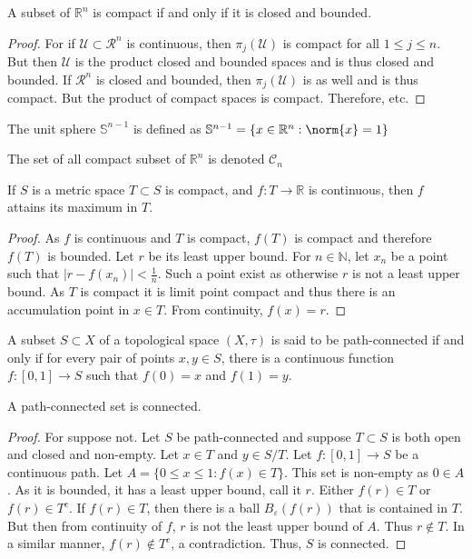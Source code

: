 \documentclass[crop=false,class=book]{standalone}
\begin{document}
\begin{theorem}
A subset of $\mathbb{R}^n$ is compact if and only if it is closed and bounded.
\end{theorem}
\begin{proof}
For if $\mathcal{U}\subset \mathcal{R}^n$ is continuous, then $\pi_{j}(\mathcal{U})$ is compact for all $1\leq j \leq n$. But then $\mathcal{U}$ is the product closed and bounded spaces and is thus closed and bounded. If $\mathcal{R}^n$ is closed and bounded, then $\pi_j(\mathcal{U})$ is as well and is thus compact. But the product of compact spaces is compact. Therefore, etc.
\end{proof}
\begin{definition}
The unit sphere $\mathbb{S}^{n-1}$ is defined as $\mathbb{S}^{n-1} = \{x\in \mathbb{R}^n: \norm{x}=1\}$
\end{definition}
\begin{notation}
The set of all compact subset of $\mathbb{R}^n$ is denoted $\mathscr{C}_n$
\end{notation}
\begin{theorem}
If $S$ is a metric space $T\subset S$ is compact, and $f:T\rightarrow \mathbb{R}$ is continuous, then $f$ attains its maximum in $T$.
\end{theorem}
\begin{proof}
As $f$ is continuous and $T$ is compact, $f(T)$ is compact and therefore $f(T)$ is bounded. Let $r$ be its least upper bound. For $n\in \mathbb{N}$, let $x_n$ be a point such that $|r-f(x_n)|< \frac{1}{n}$. Such a point exist as otherwise $r$ is not a least upper bound. As $T$ is compact it is limit point compact and thus there is an accumulation point in $x\in T$. From continuity, $f(x) = r$.
\end{proof}
\begin{definition}
A subset $S\subset X$ of a topological space $(X,\tau)$ is said to be path-connected if and only if for every pair of points $x,y\in S$, there is a continuous function $f:[0,1]\rightarrow S$ such that $f(0)=x$ and $f(1)=y$.
\end{definition}
\begin{theorem}
A path-connected set is connected.
\end{theorem}
\begin{proof}
For suppose not. Let $S$ be path-connected and suppose $T\subset S$ is both open and closed and non-empty. Let $x\in T$ and $y\in S/T$. Let $f:[0,1]\rightarrow S$ be a continuous path. Let $A =\{0\leq x \leq 1: f(x) \in T\}$. This set is non-empty as $0\in A$. As it is bounded, it has a least upper bound, call it $r$. Either $f(r)\in T$ or $f(r)\in T^c$. If $f(r)\in T$, then there is a ball $B_{\varepsilon}(f(r))$ that is contained in $T$. But then from continuity of $f$, $r$ is not the least upper bound of $A$. Thus $r\notin T$. In a similar manner, $f(r)\notin T^c$, a contradiction. Thus, $S$ is connected.
\end{proof}
\end{document}
